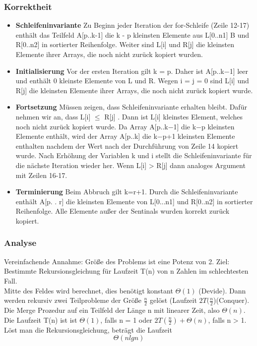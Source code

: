 \documentclass[jou,apacite]{apa6}
\begin{document}
\subsubsection{Korrektheit}
\begin{itemize}
\item {\bfseries Schleifeninvariante} Zu Beginn jeder Iteration der for-Schleife (Zeile 12-17) enthält das Teilfeld A[p..k-1] die k - p kleinsten Elemente aus L[0..n1] B und R[0..n2] in sortierter Reihenfolge. Weiter sind L[i] und R[j] die kleinsten Elemente ihrer Arrays, die noch nicht zurück kopiert wurden. 
\item {\bfseries Initialisierung} Vor der ersten Iteration gilt k = p. Daher ist A[p..k−1] leer und enthält 0 kleinste Elemente von L und R. Wegen i = j = 0 sind L[i] und R[j] die kleinsten Elemente ihrer Arrays, die noch nicht zurück kopiert wurde.
\item {\bfseries Fortsetzung} Müssen zeigen, dass Schleifeninvariante erhalten bleibt. Dafür nehmen
wir an, dass L[i] $\le$ R[j] . Dann ist L[i] kleinstes Element, welches noch nicht zurück
kopiert wurde. Da Array A[p..k−1] die k−p kleinsten Elemente enthält, wird der
Array A[p..k] die k−p+1 kleinsten Elemente enthalten nachdem der Wert nach der
Durchführung von Zeile 14 kopiert wurde. Nach Erhöhung der Variablen k und i stellt
die Schleifeninvariante für die nächste Iteration wieder her.
Wenn L[i] > R[j] dann analoges Argument mit Zeilen 16-17.
\item {\bfseries Terminierung} Beim Abbruch gilt k=r+1. Durch die Schleifeninvariante enthält A[p. . r] die kleinsten Elemente von L[0...n1] und R[0..n2] in sortierter Reihenfolge. Alle Elemente außer der Sentinals wurden korrekt zurück kopiert.
\end{itemize}

\subsubsection{Analyse}
Vereinfachende Annahme: Größe des Problems ist eine Potenz von 2. Ziel: Bestimmte Rekursionsgleichung für Laufzeit T(n) von n Zahlen im schlechtesten Fall.
\\
Mitte des Feldes wird berechnet, dies benötigt konstant $\Theta(1)$ (Devide). Dann werden rekursiv zwei Teilprobleme der Größe $\frac{n}{2}$ gelöst (Laufzeit $2T(\frac{n}{2}$)(Conquer). Die Merge Prozedur auf ein Teilfeld der Länge n mit linearer Zeit, also $\Theta(n)$. Die Laufzeit T(n) ist ist $\Theta(1)$, falls n = 1 oder $2T(\frac{n}{2})+\Theta(n)$, falls n > 1. Löst man die Rekursionsgleichung, beträgt die Laufzeit  $$\Theta(n lg n)$$
\end{document}
